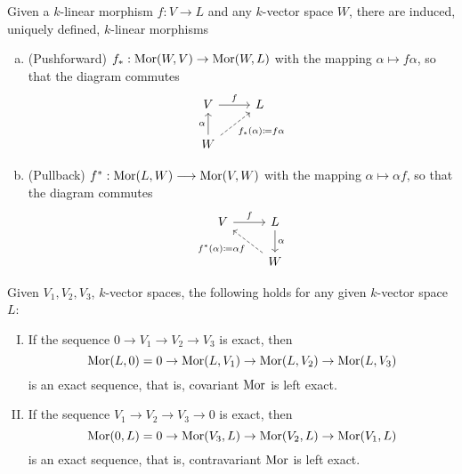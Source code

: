\begin{definition}
    Given a \(k\)-linear morphism \(f : V \to L\) and any \(k\)-vector space
    \(W\), there are induced, uniquely defined, \(k\)-linear morphisms
    \begin{enumerate}[(a)]
        \item (Pushforward) \(f_\ast : \operatorname{Mor}(W, V) \to \operatorname{Mor}(W, L)\) with the mapping
              \(\alpha \mapsto f  \alpha\), so that the diagram commutes
              \[
                  \begin{tikzcd}
                      V \ar[r, "f"]
                      &L \\
                      W \ar[u, "\alpha"]
                      \ar[ur, dashed, swap, "f_\ast(\alpha) \coloneq f  \alpha"]
                  \end{tikzcd}
              \]
        \item (Pullback) \(f^\ast : \operatorname{Mor}(L, W) \longrightarrow \operatorname{Mor}(V, W)\) with
              the mapping \(\alpha \longmapsto \alpha  f\), so that the diagram
              commutes
              \[
                  \begin{tikzcd}
                      V \ar[r, "f"]
                      &L \ar[d, "\alpha"] \\
                      &W \ar[ul, dashed, "f^\ast(\alpha) \coloneq \alpha  f"]
                  \end{tikzcd}
              \]
    \end{enumerate}
\end{definition}

\begin{proposition}
    Given \(V_1, V_2, V_3\), \(k\)-vector spaces, the following holds for any
    given \(k\)-vector space \(L\):
    \begin{enumerate}[I.]
        \item If the sequence \(0 \to V_1 \to V_2 \to V_3\) is exact, then
              \[
                  \operatorname{Mor}(L, 0) = 0 \to \operatorname{Mor}(L, V_1) \to \operatorname{Mor}(L, V_2) \to \operatorname{Mor}(L, V_3)
              \]
              is an exact sequence, that is, covariant \(\operatorname{Mor}\) is left exact.
        \item If the sequence \(V_1 \to V_2 \to V_3 \to 0\) is exact, then
              \[
                  \operatorname{Mor}(0, L) = 0 \to \operatorname{Mor}(V_3, L) \to \operatorname{Mor}(V_2, L) \to \operatorname{Mor}(V_1, L)
              \]
              is an exact sequence, that is, contravariant \(\operatorname{Mor}\) is left exact.
    \end{enumerate}
\end{proposition}

